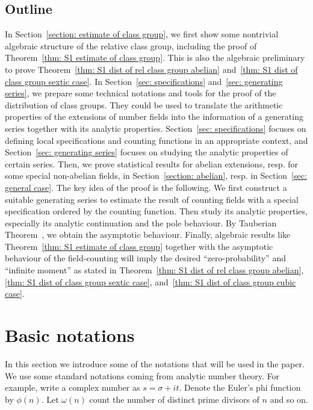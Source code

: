 \documentclass{amsart}
\numberwithin{equation}{section}
\theoremstyle{plain}
\theoremstyle{definition}
\theoremstyle{remark}
\begin{document}
\subsection{Outline}
In Section~\ref{section: estimate of class group}, we first show some nontrivial algebraic structure of the relative class group, including the proof of Theorem~\ref{thm: S1 estimate of class group}.
This is also the algebraic preliminary to prove Theorem~\ref{thm: S1 dist of rel class group abelian} and~\ref{thm: S1 dist of class group sextic case}.
In Section~\ref{sec: specifications} and~\ref{sec: generating series}, we prepare some technical notations and tools for the proof of the distribution of class groups.
They could be used to translate the arithmetic properties of the extensions of number fields into the information of a generating series together with its analytic properties.
Section~\ref{sec: specifications} focuses on defining local specifications and counting functions in an appropriate context,
and Section~\ref{sec: generating series} focuses on studying the analytic properties of certain series.
Then, we prove statistical results for abelian extensions, resp. for some special non-abelian fields, in Section~\ref{section: abelian}, resp. in Section~\ref{sec: general case}.
The key idea of the proof is the following.
We first construct a suitable generating series to estimate the result of counting fields with a special specification ordered by the counting function.
Then study its analytic properties, especially its analytic continuation and the pole behaviour.
By Tauberian Theorem~\cite[Appendix II Theorem I]{narkiewicz2014elementary}, we obtain the asymptotic behaviour.
Finally, algebraic results like Theorem~\ref{thm: S1 estimate of class group} together with the asymptotic behaviour of the field-counting will imply the desired ``zero-probability'' and ``infinite moment'' as stated in Theorem~\ref{thm: S1 dist of rel class group abelian}, \ref{thm: S1 dist of class group sextic case}, and~\ref{thm: S1 dist of class group cubic case}.

\section{Basic notations}\label{section:notation}
In this section we introduce some of the notations that will be used in the paper.
We use some standard notations coming from analytic number theory.
For example, write a complex number as $s=\sigma+it$.
Denote the Euler's phi function by $\phi(n)$.
Let $\omega(n)$ count the number of distinct prime divisors of $n$ and so on.
\end{document}
